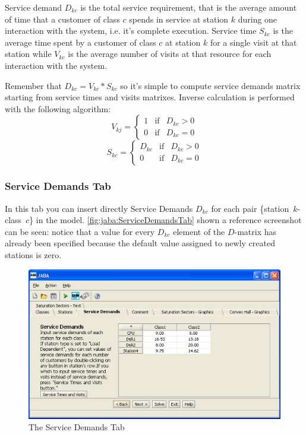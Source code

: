 Service demand $D_{kc}$ is the total service requirement, that is
the average amount of time that a customer of class $c$ spends in
service at station $k$ during one interaction with the system, i.e.
it's complete execution. Service time $S_{kc}$ is the average time
spent by a customer of class $c$ at station $k$ for a single visit
at that station while $V_{kc}$ is the average number of visits at
that resource for each interaction with the system.

Remember that $D_{kc} = V_{kc} * S_{kc}$ so it's simple to compute
service demands matrix starting from service times and visits
matrixes. Inverse calculation is performed with the following
algorithm:
\[
V_{kj} = \left\{
\begin{array}{ccl} 1 & \textrm{if} & D_{kc} > 0 \\
0 & \textrm{if} & D_{kc} = 0 \end{array}\right.
\]
\[
S_{kc} = \left\{ \begin{array}{ccl} D_{kc} & \textrm{if} & D_{kc}
> 0 \\ 0 & \textrm{if} & D_{kc} = 0 \end{array}\right.
\]

\subsubsection{Service Demands Tab}
In this tab you can insert directly Service Demands $D_{kc}$ for
each pair \{station~$k$-class~$c$\} in the model. \autoref{fig:jaba:ServiceDemandsTab} shown a reference screenshot can be seen: notice that a value for every $D_{kc}$ element of the $D$-matrix has already been specified because the default value assigned to newly created stations is zero.
\begin{figure}[htbp]
    \begin{center}
        \includegraphics[scale=.5]{img/jaba/serviceDemands}
    \end{center}
    \caption{The Service Demands Tab}
    \label{fig:jaba:ServiceDemandsTab}
\end{figure}

